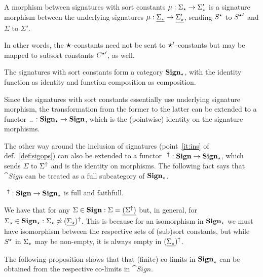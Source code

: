 \begin{definition}
A morphism between signatures with sort constants $\mu:\Sigma_\star \to
\Sigma'_{\star}$ is a signature morphism between the underlying
signatures $\mu:\underline{\Sigma_\star}\to\underline{\Sigma'_\star}$, sending
$S^\star$ to ${S^\star}'$ and $\Sigma$ to $\Sigma'$.
\end{definition}
In other words, the $\mbox{\Large{$\star$}}$-constants need not be sent to $\mbox{\Large{$\star$}}'$-constants
but may be mapped to subsort constants ${C^\star}'$, as well.

\begin{fact}
The signatures with sort constants form a category ${\bf Sign_\star}$, with
the identity function as identity and function composition as composition.
\end{fact}
%
Since the signatures with sort constants essentially use underlying signature
morphism, the transformation from the former to the latter
can be extended to a functor ${\sf {_-}}:{\bf Sign_\star} \to
{\bf Sign}$, which is the (pointwise) identity on the signature morphisms. 

The other way around the inclusion of signatures (point~\ref{it:ins} of
def.~\ref{def:sigops}) can also be extended to a
functor $\fu{\ins\ }:\cat{Sign} \to \cat{Sign_\cons}$, which sends $\Sigma$
to $\Sigma^\uparrow$ and is the identity on morphisms. The following fact says
that $\cat{Sign}$ can be treated as a full subcategory of ${\bf Sign_\star}$.

\begin{fact}
$\ ^\uparrow:{\bf Sign} \to {\bf Sign_\star}$ is full and faithfull.
\end{fact}
We have that for any $\Sigma\in{\bf Sign}:\Sigma=\underline{(\Sigma^\uparrow)}$ but,
in general, for $\Sigma_\star\in{\bf Sign_\star}: \Sigma_\star\not\mathrel{\simeq}
(\underline{\Sigma_\star})^\uparrow$. This is because for an isomorphism in
${\bf Sign_\star}$ we must have isomorphism between the respective sets of
(sub)sort constants, but while $S^\star$ in $\Sigma_\star$ may be
non-empty, it is always empty in $(\underline{\Sigma_\star})^\uparrow$.

%
The following proposition shows that
 that (finite) co-limits in ${\bf Sign}_\star$
can be obtained from the respective co-limits in $\cat{Sign}$. 

